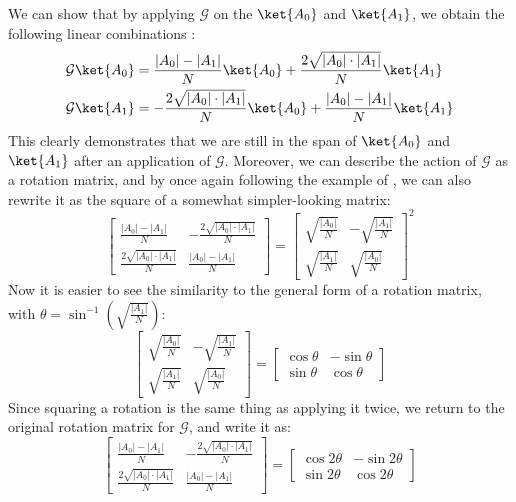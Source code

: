We can show that by applying $\mathcal{G}$ on the $\ket{A_0}$ and $\ket{A_1}$, we obtain the following linear combinations \cite{Qiskit2023}:
\begin{align*}
    \mathcal{G}\ket{A_0} &= \frac{|A_0|- |A_1|}{N}\ket{A_0} + \frac{2\sqrt{|A_0| \cdot |A_1|}}{N}\ket{A_1} \\
    \mathcal{G}\ket{A_1} &= -\frac{2\sqrt{|A_0| \cdot |A_1|}}{N}\ket{A_0} + \frac{|A_0|- |A_1|}{N}\ket{A_1}
\end{align*}
This clearly demonstrates that we are still in the span of $\ket{A_0}$ and $\ket{A_1}$ after an application of $\mathcal{G}$. Moreover, we can describe the action of $\mathcal{G}$ as a rotation matrix, and by once again following the example of \textcite{Qiskit2023}, we can also rewrite it as the square of a somewhat simpler-looking matrix:
\[
\begin{bmatrix}
    \frac{|A_0|- |A_1|}{N} & -\frac{2\sqrt{|A_0| \cdot |A_1|}}{N} \\
      \frac{2\sqrt{|A_0| \cdot |A_1|}}{N}   & \frac{|A_0|- |A_1|}{N}
\end{bmatrix} = 
\begin{bmatrix}
    \sqrt{\frac{|A_0|}{N}} & -\sqrt{\frac{|A_1|}{N}}\\
    \sqrt{\frac{|A_1|}{N}} & \sqrt{\frac{|A_0|}{N}}
\end{bmatrix}^2
\]
Now it is easier to see the similarity to the general form of a rotation matrix, with $\theta = \sin ^{-1} \left (\sqrt{\frac{|A_1|}{N}} \right )$: 
\[
\begin{bmatrix}
    \sqrt{\frac{|A_0|}{N}} & -\sqrt{\frac{|A_1|}{N}}\\
    \sqrt{\frac{|A_1|}{N}} & \sqrt{\frac{|A_0|}{N}}
\end{bmatrix} = \begin{bmatrix}
    \cos \theta & -\sin \theta \\
    \sin \theta & \cos \theta
\end{bmatrix}
\]
Since squaring a rotation is the same thing as applying it twice, we return to the original rotation matrix for $\mathcal{G}$, and write it as:
\[
\begin{bmatrix}
    \frac{|A_0|- |A_1|}{N} & -\frac{2\sqrt{|A_0| \cdot |A_1|}}{N} \\
      \frac{2\sqrt{|A_0| \cdot |A_1|}}{N}   & \frac{|A_0|- |A_1|}{N}
\end{bmatrix} = \begin{bmatrix}
    \cos 2\theta & -\sin 2\theta \\
    \sin 2\theta & \cos 2\theta
\end{bmatrix}
\]
